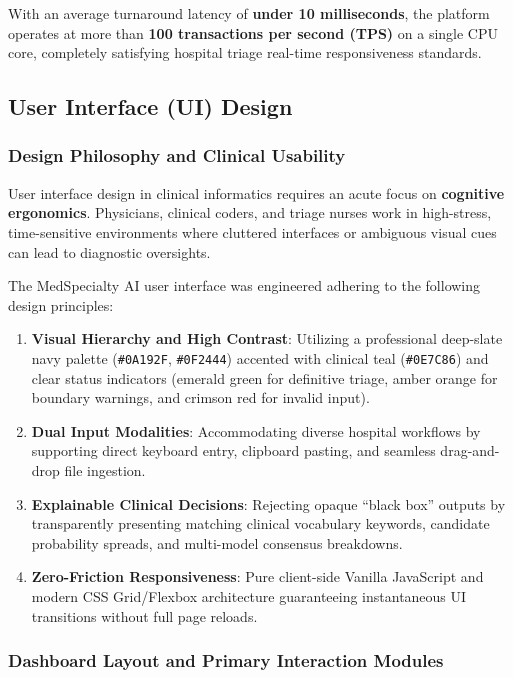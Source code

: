 With an average turnaround latency of \textbf{under 10 milliseconds}, the platform operates at more than \textbf{100 transactions per second (TPS)} on a single CPU core, completely satisfying hospital triage real-time responsiveness standards.

\subsection{User Interface (UI) Design}

\subsubsection{Design Philosophy and Clinical Usability}

User interface design in clinical informatics requires an acute focus on \textbf{cognitive ergonomics}. Physicians, clinical coders, and triage nurses work in high-stress, time-sensitive environments where cluttered interfaces or ambiguous visual cues can lead to diagnostic oversights. 

The MedSpecialty AI user interface was engineered adhering to the following design principles:
\begin{enumerate}
    \item \textbf{Visual Hierarchy and High Contrast}: Utilizing a professional deep-slate navy palette (\texttt{\#0A192F}, \texttt{\#0F2444}) accented with clinical teal (\texttt{\#0E7C86}) and clear status indicators (emerald green for definitive triage, amber orange for boundary warnings, and crimson red for invalid input).
    \item \textbf{Dual Input Modalities}: Accommodating diverse hospital workflows by supporting direct keyboard entry, clipboard pasting, and seamless drag-and-drop file ingestion.
    \item \textbf{Explainable Clinical Decisions}: Rejecting opaque ``black box'' outputs by transparently presenting matching clinical vocabulary keywords, candidate probability spreads, and multi-model consensus breakdowns.
    \item \textbf{Zero-Friction Responsiveness}: Pure client-side Vanilla JavaScript and modern CSS Grid/Flexbox architecture guaranteeing instantaneous UI transitions without full page reloads.
\end{enumerate}

\subsubsection{Dashboard Layout and Primary Interaction Modules}

